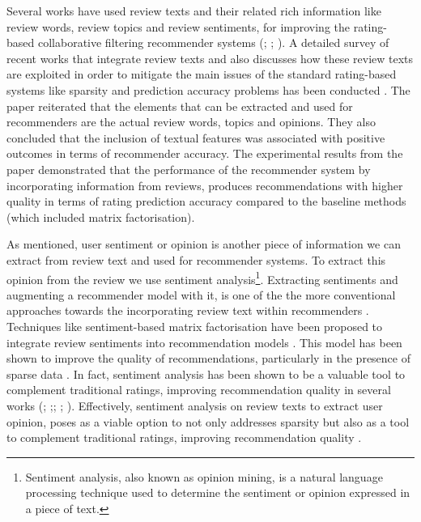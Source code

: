 Several works have used review texts and their related rich information like review words, review topics and review sentiments, for improving the rating-based collaborative filtering recommender systems (\cite{he2015trirank}; \cite{hariri2011context}; \cite{zhang2014urcf}). A detailed survey of recent works that integrate review texts and also discusses how these review texts are exploited in order to mitigate the main issues of the standard rating-based systems like sparsity and prediction accuracy problems has been conducted \cite{srifi2020recommender}. The paper reiterated that the elements that can be extracted and used for recommenders are the actual review words, topics and opinions. They also concluded that the inclusion of textual features was associated with positive outcomes in terms of recommender accuracy. The experimental results from the paper demonstrated that the performance of the recommender system by incorporating information from reviews, produces recommendations with higher quality in terms of rating prediction accuracy compared to the baseline methods (which included matrix factorisation).


As mentioned, user sentiment or opinion is another piece of information we can extract from review text and used for recommender systems. To extract this opinion from the review we use sentiment analysis\footnote{Sentiment analysis, also known as opinion mining, is a natural language processing technique used to determine the sentiment or opinion expressed in a piece of text.}. Extracting sentiments and augmenting a recommender model with it, is one of the the more conventional approaches towards the incorporating review text within recommenders \cite{kim2016convolutional}. Techniques like sentiment-based matrix factorisation have been proposed to integrate review sentiments into recommendation models \cite{shen2019sentiment}. This model has been shown to improve the quality of recommendations, particularly in the presence of sparse data \cite{shen2019sentiment}. In fact, sentiment analysis has been shown to be a valuable tool to complement traditional ratings, improving recommendation quality in several works (\cite{shen2019sentiment}; \cite{kim2016convolutional};\cite{dang2021approach};  \cite{dang2020sentiment}; \cite{diao2014jointly}). Effectively, sentiment analysis on review texts to extract user opinion, poses as a viable option to not only addresses sparsity but also as a tool to complement traditional ratings, improving recommendation quality \cite{shoja2019customer}.

